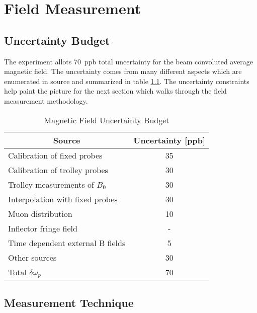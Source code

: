 \chapter{Field Measurement} \label{ch:field-meaurement}

\section{Uncertainty Budget}

The \mugmtwo experiment allots \SI{70}{ppb} total uncertainty for the beam convoluted average magnetic field.  The uncertainty comes from many different aspects which are enumerated in source \cite{e989-tdr} and summarized in table \ref{tab:field-uncertainties}.  The uncertainty constraints help paint the picture for the next section which walks through the field measurement methodology.

\begin{table}[h]
\label{tab:field-uncertainties}
\caption{Magnetic Field Uncertainty Budget}
\centering
\begin{tabular}{l c}
    \hline
    \multicolumn{1}{c}{Source} & Uncertainty [ppb] \\
    \hline
    Calibration of fixed probes      & 35 \\
    Calibration of trolley probes    & 30 \\
    Trolley measurements of $B_0$    & 30 \\
    Interpolation with fixed probes  & 30 \\
    Muon distribution                & 10 \\
    Inflector fringe field           & -  \\
    Time dependent external B fields & 5  \\
    Other sources                    & 30 \\
    \hline
    Total $\delta \omega_p$          & 70 \\
    \hline
\end{tabular}
\end{table}

\section{Measurement Technique} \label{sec:field-measurement-technique}

